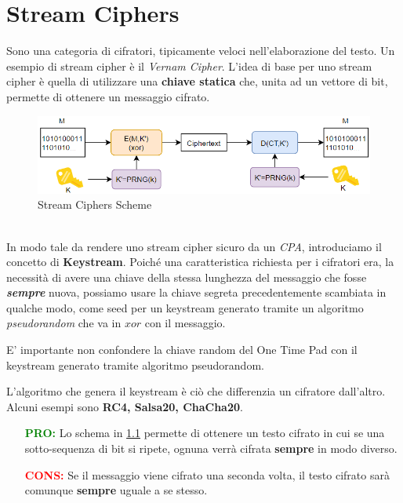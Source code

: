 \chapter{Stream Ciphers}\label{chap:streamcipher}
Sono una categoria di cifratori, tipicamente veloci nell'elaborazione del testo. Un esempio di stream cipher è il \textit{Vernam Cipher}. L'idea di base per uno stream cipher è quella di utilizzare una \textbf{chiave statica} che, unita ad un vettore di bit, permette di ottenere un messaggio cifrato.
\begin{figure}[h]
    \centering
    \includegraphics[width=\textwidth]{image/streamcipher.png}
    \caption{Stream Ciphers Scheme}
    \label{fig:stream_ciphers}
\end{figure}\\
In modo tale da rendere uno stream cipher sicuro da un \textit{CPA}, introduciamo il concetto di \textbf{Keystream}. Poiché una caratteristica richiesta per i cifratori era, la necessità di avere una chiave della stessa lunghezza del messaggio che fosse \textit{\textbf{sempre}} nuova, possiamo usare la chiave segreta precedentemente scambiata in qualche modo, come seed per un keystream generato tramite un algoritmo \textit{pseudorandom} che va in $xor$ con il messaggio.\\
\begin{remark}
E' importante non confondere la chiave random del One Time Pad con il keystream generato tramite algoritmo pseudorandom.
\end{remark}
\begin{remark}
L'algoritmo che genera il keystream è ciò che differenzia un cifratore dall'altro. Alcuni esempi sono \textbf{RC4, Salsa20, ChaCha20}.
\end{remark}
\begin{proposition}
\begin{itemize}
    \item [\textcolor{green}{\textbf{PRO:}}]Lo schema in \cref{fig:stream_ciphers} permette di ottenere un testo cifrato in cui se una sotto-sequenza di bit si ripete, ognuna verrà cifrata \textbf{sempre} in modo diverso.
    \item [\textcolor{red}{\textbf{CONS:}}]Se il messaggio viene cifrato una seconda volta, il testo cifrato sarà comunque \textbf{sempre} uguale a se stesso.
\end{itemize}
\end{proposition}
